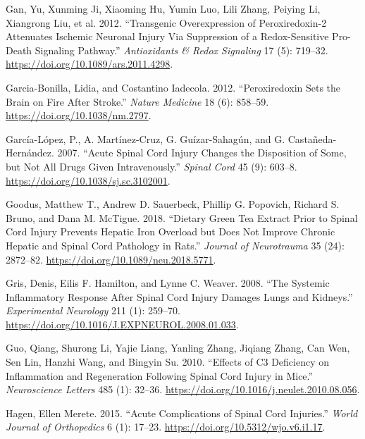 \documentclass[9pt,lineno]{elife}
\newlength{\cslhangindent}
\newlength{\cslentryspacingunit} %
\newenvironment{CSLReferences}[2] %
 {%
  \setlength{\parindent}{0pt}
  \ifodd #1
  \let\oldpar\par
  \def\par{\hangindent=\cslhangindent\oldpar}
  \fi
  \setlength{\parskip}{#2\cslentryspacingunit}
 }%
 {}
\begin{document}
\begin{landscape}
\begin{landscape}
\begin{landscape}
\begin{landscape}
\begin{CSLReferences}{1}{0}
\leavevmode{}%
Gan, Yu, Xunming Ji, Xiaoming Hu, Yumin Luo, Lili Zhang, Peiying Li, Xiangrong Liu, et al. 2012. {``Transgenic {Overexpression} of {Peroxiredoxin-2 Attenuates Ischemic Neuronal Injury Via Suppression} of a {Redox-Sensitive Pro-Death Signaling Pathway}.''} \emph{Antioxidants \& Redox Signaling} 17 (5): 719--32. \url{https://doi.org/10.1089/ars.2011.4298}.

\leavevmode{}%
Garcia-Bonilla, Lidia, and Costantino Iadecola. 2012. {``Peroxiredoxin Sets the Brain on Fire After Stroke.''} \emph{Nature Medicine} 18 (6): 858--59. \url{https://doi.org/10.1038/nm.2797}.

\leavevmode{}%
García-López, P., A. Martínez-Cruz, G. Guízar-Sahagún, and G. Castañeda-Hernández. 2007. {``Acute Spinal Cord Injury Changes the Disposition of Some, but Not All Drugs Given Intravenously.''} \emph{Spinal Cord} 45 (9): 603--8. \url{https://doi.org/10.1038/sj.sc.3102001}.

\leavevmode{}%
Goodus, Matthew T., Andrew D. Sauerbeck, Phillip G. Popovich, Richard S. Bruno, and Dana M. McTigue. 2018. {``Dietary Green Tea Extract Prior to Spinal Cord Injury Prevents Hepatic Iron Overload but Does Not Improve Chronic Hepatic and Spinal Cord Pathology in Rats.''} \emph{Journal of Neurotrauma} 35 (24): 2872--82. \url{https://doi.org/10.1089/neu.2018.5771}.

\leavevmode{}%
Gris, Denis, Eilis F. Hamilton, and Lynne C. Weaver. 2008. {``The Systemic Inflammatory Response After Spinal Cord Injury Damages Lungs and Kidneys.''} \emph{Experimental Neurology} 211 (1): 259--70. \url{https://doi.org/10.1016/J.EXPNEUROL.2008.01.033}.

\leavevmode{}%
Guo, Qiang, Shurong Li, Yajie Liang, Yanling Zhang, Jiqiang Zhang, Can Wen, Sen Lin, Hanzhi Wang, and Bingyin Su. 2010. {``Effects of {C3} Deficiency on Inflammation and Regeneration Following Spinal Cord Injury in Mice.''} \emph{Neuroscience Letters} 485 (1): 32--36. \url{https://doi.org/10.1016/j.neulet.2010.08.056}.

\leavevmode{}%
Hagen, Ellen Merete. 2015. {``Acute Complications of Spinal Cord Injuries.''} \emph{World Journal of Orthopedics} 6 (1): 17--23. \url{https://doi.org/10.5312/wjo.v6.i1.17}.


\end{CSLReferences}
\end{landscape}
\end{landscape}
\end{landscape}
\end{landscape}
\end{document}
